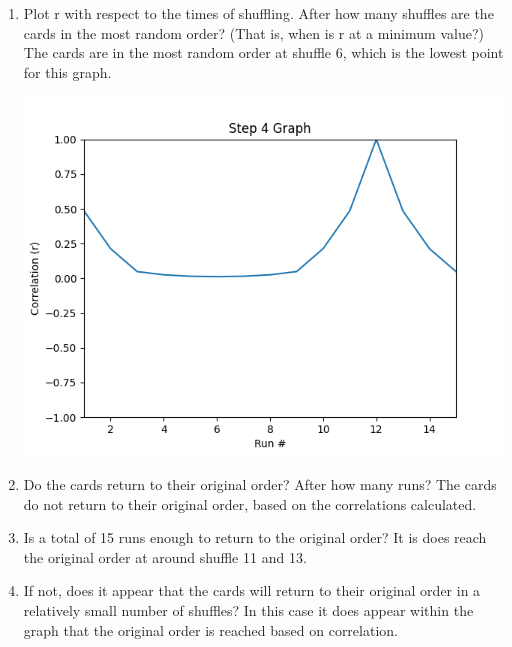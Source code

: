 \documentclass[12pt]{article}
\begin{document}
    \begin{enumerate}
        \item Plot r with respect to the times of shuffling. After how many shuffles are the cards 
        in the most random order? (That is, when is r at a minimum value?)
        \subitem The cards are in the most random order at shuffle 6, which is the lowest point for this graph.\\
        \begin{minipage}[t]{\linewidth}
            \centering
            {
              \includegraphics[width=.7\linewidth]{Figure_4.png}
            }
            \medskip       
        \end{minipage}
        \item Do the cards return to their original order?  After how many runs?
        \subitem The cards do not return to their original order, based on the correlations calculated.
        \item Is a total of 15 runs enough to return to the original order?
        \subitem It is does reach the original order at around shuffle 11 and 13.
        \item If not, does it appear that the cards will return to their original order in a relatively 
        small number of shuffles?
        \subitem In this case it does appear within the graph that the original order is reached based on correlation.
    \end{enumerate}
\end{document}
